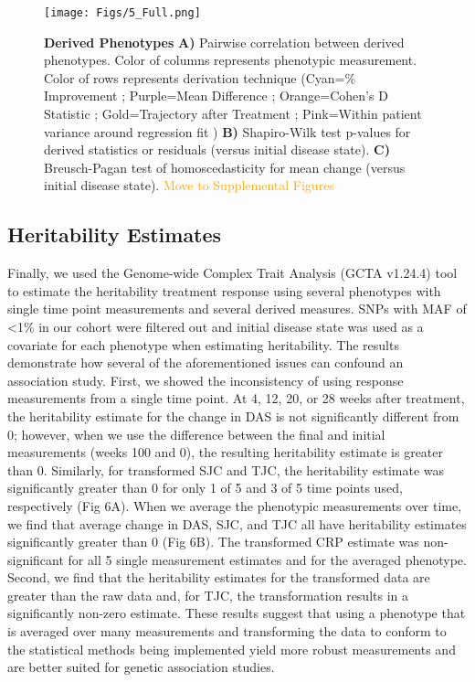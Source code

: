 \begin{figure}[h!]
  \centering
  \texttt{[image: Figs/5\_Full.png]}
  \caption{ {\bf Derived Phenotypes} {\bf A)} Pairwise correlation between derived phenotypes. Color of columns represents phenotypic measurement. Color of rows represents derivation technique (Cyan=\% Improvement ; Purple=Mean Difference ; Orange=Cohen's D Statistic ; Gold=Trajectory after Treatment ; Pink=Within patient variance around regression fit ) {\bf B)} Shapiro-Wilk test p-values for derived statistics or residuals (versus initial disease state). {\bf C)} Breusch-Pagan test of homoscedasticity for mean change (versus initial disease state). \textcolor{orange}{Move to Supplemental Figures}}
  \label{FIG_5}
\end{figure}


\subsection{Heritability Estimates}

Finally, we used the Genome-wide Complex Trait Analysis (GCTA v1.24.4) tool to estimate the heritability treatment response using several phenotypes with single time point measurements and several derived measures. SNPs with MAF of \textless1\% in our cohort were filtered out and initial disease state was used as a covariate for each phenotype when estimating heritability. The results demonstrate how several of the aforementioned issues can confound an association study. First, we showed the inconsistency of using response measurements from a single time point. At 4, 12, 20, or 28 weeks after treatment, the heritability estimate for the change in DAS is not significantly different from 0; however, when we use the difference between the final and initial measurements (weeks 100 and 0), the resulting heritability estimate is greater than 0. Similarly, for transformed SJC and TJC, the heritability estimate was significantly greater than 0 for only 1 of 5 and 3 of 5 time points used, respectively (Fig 6A). When we average the phenotypic measurements over time, we find that average change in DAS, SJC, and TJC all have heritability estimates significantly greater than 0 (Fig 6B). The transformed CRP estimate was non-significant for all 5 single measurement estimates and for the averaged phenotype. Second, we find that the heritability estimates for the transformed data are greater than the raw data and, for TJC, the transformation results in a significantly non-zero estimate. These results suggest that using a phenotype that is averaged over many measurements and transforming the data to conform to the statistical methods being implemented yield more robust measurements and are better suited for genetic association studies.

